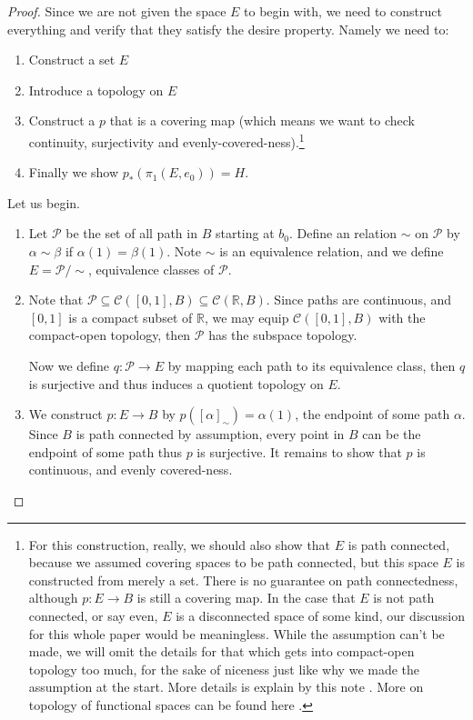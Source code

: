 \documentclass{amsart}
\theoremstyle{definition}
\theoremstyle{remark}
\numberwithin{equation}{section}
\begin{document}
\begin{proof}
    Since we are not given the space $E$ to begin with, we need to construct everything and verify that they satisfy the desire property. Namely we need to:
    \begin{enumerate}
        \item Construct a set $E$
        \item Introduce a topology on $E$
        \item Construct a $p$ that is a covering map (which means we want to check continuity, surjectivity and evenly-covered-ness).\footnote{For this construction, really, we should also show that $E$ is path connected, because we assumed covering spaces to be path connected, but this space $E$ is constructed from merely a set. There is no guarantee on path connectedness, although $p: E \rightarrow B$ is still a covering map. In the case that $E$ is not path connected, or say even, $E$ is a disconnected space of some kind, our discussion for this whole paper would be meaningless. While the assumption can't be made, we will omit the details for that which gets into compact-open topology too much, for the sake of niceness just like why we made the assumption at the start. More details is explain by this note \cite{bha}. More on topology of functional spaces can be found here \cite{func}.}
        \item Finally we show $p_\ast(\pi_1(E, e_0)) = H.$
    \end{enumerate}
    Let us begin.
    \begin{enumerate}
        \item Let $\mathcal{P}$ be the set of all path in $B$ starting at $b_0$. Define an relation $\sim$ on $\mathcal{P}$ by $\alpha \sim \beta$ if $\alpha(1) = \beta(1).$ Note $\sim$ is an equivalence relation, and we define $E = \mathcal{P}/\sim$, equivalence classes of $\mathcal{P}$.

        \item Note that $\mathcal{P} \subseteq \mathcal{C}([0,1], B) \subseteq \mathcal{C}(\mathbb{R}, B)$. Since paths are continuous, and $[0,1]$ is a compact subset of $\mathbb{R}$, we may equip $\mathcal{C}([0,1], B)$ with the compact-open topology, then $\mathcal{P}$ has the subspace topology.

        \noindent Now we define $q: \mathcal{P} \rightarrow E$ by mapping each path to its equivalence class, then $q$ is surjective and thus induces a quotient topology on $E$.

        \item We construct $p: E \rightarrow B$ by $p([\alpha]_\sim) = \alpha(1)$, the endpoint of some path $\alpha$. Since $B$ is path connected by assumption, every point in $B$ can be the endpoint of some path thus $p$ is surjective. It remains to show that $p$ is continuous, and evenly covered-ness.


\end{enumerate}
\end{proof}
\end{document}
